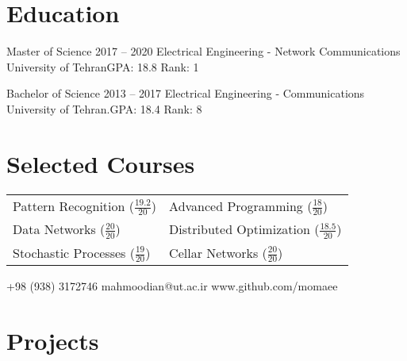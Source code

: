 \documentclass{tccv}
\begin{document}
\section{Education}
\begin{yearlist}
	\item[Master of Science]{2017 -- 2020}
	{Electrical Engineering - Network Communications}
	{University of Tehran\newline GPA: 18.8 \newline Rank: 1}
	
	\item[Bachelor of Science]{2013 -- 2017}
	{Electrical Engineering - Communications}
	{University of Tehran.\newline GPA: 18.4 \newline Rank: 8}
\end{yearlist}

\section{Selected Courses}
\begin{tabular}{ll}
	Pattern Recognition ($\frac{19.2}{20}$)	&Advanced Programming ($\frac{18}{20}$) \\
	Data Networks ($\frac{20}{20}$)			&Distributed Optimization ($\frac{18.5}{20}$) \\
	Stochastic Processes ($\frac{19}{20}$)	&Cellar Networks ($\frac{20}{20}$)
\end{tabular}

    {+98 (938) 3172746}
    {mahmoodian@ut.ac.ir}
    {www.github.com/momaee}

\section{Projects}
\end{document}
